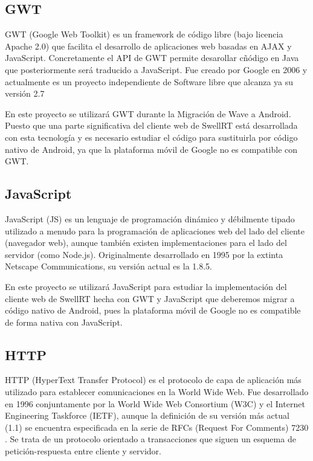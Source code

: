     \subsection{GWT}\label{ssec:gwt}
    
	GWT \cite{ref:gwt} (Google Web Toolkit) es un framework de código libre (bajo licencia Apache 2.0) que facilita el desarrollo de aplicaciones web basadas en AJAX y JavaScript. Concretamente el API de GWT permite desarollar cñódigo en Java que posteriormente será traducido a JavaScript. Fue creado por Google en 2006 y actualmente es un proyecto independiente de Software libre que alcanza ya su versión 2.7
	
	En este proyecto se utilizará GWT durante la Migración de Wave a Android. Puesto que una parte significativa del cliente web de SwellRT está desarrollada con esta tecnología y es necesario estudiar el código para sustituirla por código nativo de Android, ya que la plataforma móvil de Google no es compatible con GWT.
    
    \subsection{JavaScript}\label{ssec:javascript}
    
	JavaScript \cite{ref:javascript} (JS) es un lenguaje de programación dinámico y débilmente tipado utilizado a menudo para la programación de aplicaciones web del lado del cliente (navegador web), aunque también existen implementaciones para el lado del servidor (como Node.js). Originalmente desarrollado en 1995 por la extinta Netscape Communications, su versión actual es la 1.8.5.  
	
	En este proyecto se utilizará JavaScript para estudiar la implementación del cliente web de SwellRT hecha con GWT y JavaScript que deberemos migrar a código nativo de Android, pues la plataforma móvil de Google no es compatible de forma nativa con JavaScript.
    
    \subsection{HTTP}\label{ssec:HTTP}
    
	HTTP \cite{ref:HTTP} (HyperText Transfer Protocol) es el protocolo de capa de aplicación más utilizado para establecer comunicaciones en la World Wide Web. Fue desarrollado en 1996 conjuntamente por la World Wide Web Consortium (W3C) y el Internet Engineering Taskforce (IETF), aunque la definición de su versión más actual (1.1) se encuentra especificada en la serie de RFCs (Request For Comments) 7230 \cite{ref:HTTP}. Se trata de un protocolo orientado a transacciones que siguen un esquema de petición-respuesta entre cliente y servidor. 
	
